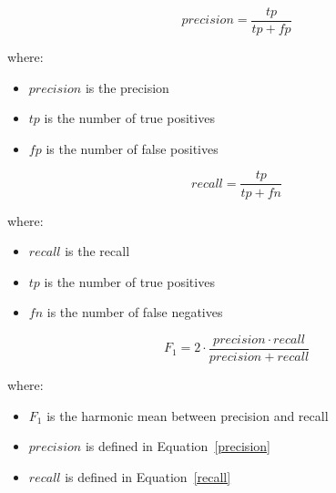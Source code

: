 \documentclass[11pt,a4paper]{article}
\begin{document}
\begin{equation}\label{precision}
precision = \frac{tp}{tp+fp}
\end{equation}

\noindent
where:
\begin{itemize}
    \itemsep=0pt
    \item $precision$ is the precision
    \item $tp$ is the number of true positives
    \item $fp$ is the number of false positives
\end{itemize}

\begin{equation}\label{recall}
recall = \frac{tp}{tp+fn}
\end{equation}

\noindent
where:
\begin{itemize}
    \itemsep=0pt
    \item $recall$ is the recall
    \item $tp$ is the number of true positives
    \item $fn$ is the number of false negatives
\end{itemize}

\begin{equation}
F_{1} = 2 \cdot \frac{precision \cdot recall}{precision+recall}
\end{equation}

\noindent
where:
\begin{itemize}
    \itemsep=0pt
    \item $F_{1}$ is the harmonic mean between precision and recall
    \item $precision$ is defined in Equation~\ref{precision}
    \item $recall$ is defined in Equation~\ref{recall}
\end{itemize}
\end{document}
